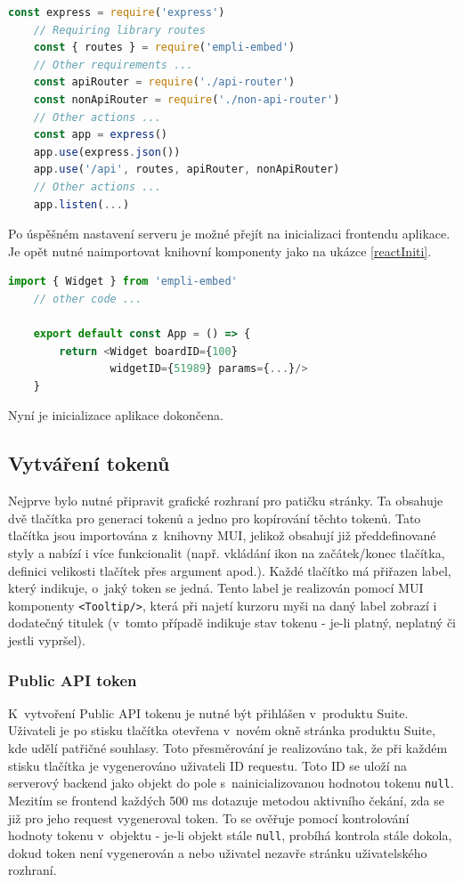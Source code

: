 \documentclass[czech, bc, kiv, he, iso690numb, viewonly]{fasthesis} %
\begin{document}
\begin{lstlisting}[language=Javascript, caption={Inicializace Express serveru}, label=expressInit]
	const express = require('express')
	// Requiring library routes
	const { routes } = require('empli-embed') 
	// Other requirements ...
	const apiRouter = require('./api-router')
	const nonApiRouter = require('./non-api-router')
	// Other actions ...
	const app = express()
	app.use(express.json())
	app.use('/api', routes, apiRouter, nonApiRouter)
	// Other actions ...
	app.listen(...)
\end{lstlisting}

Po úspěšném nastavení serveru je možné přejít na inicializaci frontendu aplikace. Je opět nutné naimportovat knihovní komponenty jako na ukázce \ref{reactIniti}.
\begin{lstlisting}[language=Javascript, caption={Inicializace React komponenty}, label=reactIniti]
	import { Widget } from 'empli-embed'
	// other code ...

	export default const App = () => {
		return <Widget boardID={100} 
				widgetID={51989} params={...}/>
	}
\end{lstlisting}

Nyní je inicializace aplikace dokončena. 

\subsection{Vytváření tokenů}

Nejprve bylo nutné připravit grafické rozhraní pro patičku stránky. Ta obsahuje dvě tlačítka pro generaci tokenů a jedno pro kopírování těchto tokenů. Tato tlačítka
jsou importována z~knihovny MUI, jelikož obsahují již předdefinované styly a nabízí i více funkcionalit (např. vkládání ikon na začátek/konec tlačítka, definici velikosti
tlačítek přes argument apod.). Každé tlačítko má přiřazen label, který indikuje, o~jaký token se jedná. Tento label je realizován pomocí MUI komponenty
\texttt{<Tooltip/>}, která při najetí kurzoru myši na daný label zobrazí i dodatečný titulek (v~tomto případě indikuje stav tokenu - je-li platný, neplatný či jestli vypršel).


\subsubsection{Public API token}
K~vytvoření Public API tokenu je nutné být přihlášen v~produktu Suite. Uživateli je po stisku tlačítka otevřena v~novém okně stránka produktu Suite, kde udělí patřičné souhlasy. 
Toto přesměrování je realizováno tak, že při každém stisku tlačítka je vygenerováno uživateli ID requestu. Toto ID se uloží na serverový backend jako objekt do pole s~nainicializovanou
hodnotou tokenu \texttt{null}. Mezitím se frontend každých 500 ms dotazuje metodou aktivního čekání, zda se již pro jeho request vygeneroval token. To se ověřuje pomocí kontrolování hodnoty
tokenu v~objektu - je-li objekt stále \texttt{null}, probíhá kontrola stále dokola, dokud token není vygenerován a nebo uživatel nezavře stránku uživatelského rozhraní.
\end{document}
